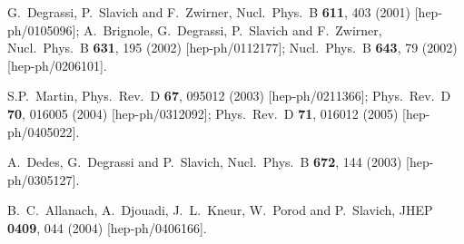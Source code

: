 \documentclass[11pt]{article}
\begin{document}
\begin{thebibliography}{999}
G.~Degrassi, P.~Slavich and F.~Zwirner,
  Nucl.\ Phys.\ B {\bf 611}, 403 (2001)
  [hep-ph/0105096];
A.~Brignole, G.~Degrassi, P.~Slavich and F.~Zwirner,
  Nucl.\ Phys.\ B {\bf 631}, 195 (2002)
  [hep-ph/0112177];
  Nucl.\ Phys.\ B {\bf 643}, 79 (2002)
  [hep-ph/0206101].
  
S.P.~Martin,
  Phys.\ Rev.\ D {\bf 67}, 095012 (2003)
  [hep-ph/0211366];
  Phys.\ Rev.\ D {\bf 70}, 016005 (2004)
  [hep-ph/0312092];
  Phys.\ Rev.\ D {\bf 71}, 016012 (2005)
  [hep-ph/0405022].

  A.~Dedes, G.~Degrassi and P.~Slavich,
  Nucl.\ Phys.\ B {\bf 672}, 144 (2003)
  [hep-ph/0305127].

  B.~C.~Allanach, A.~Djouadi, J.~L.~Kneur, W.~Porod and P.~Slavich,
  JHEP {\bf 0409}, 044 (2004)
  [hep-ph/0406166].
    

\end{thebibliography}
\end{document}
